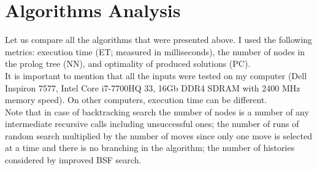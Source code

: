 \documentclass{article}
\begin{document}
\section{Algorithms Analysis}
Let us compare all the algorithms that were presented above. I used the following metrics: execution time (ET; measured in milliseconds), the number of nodes in the prolog tree (NN), and optimality of produced solutions (PC).\\
It is important to mention that all the inputs were tested on my computer (Dell Inspiron 7577,  Intel Core i7-7700HQ 33, 16Gb DDR4 SDRAM with 2400 MHz memory speed). On other computers, execution time can be different.\\
Note that in case of backtracking search the number of nodes is a number of any intermediate recursive calls including unsuccessful ones; the number of runs of random search multiplied by the number of moves since only one move is selected at a time and there is no branching in the algorithm; the number of histories considered by improved BSF search. 
\end{document}
